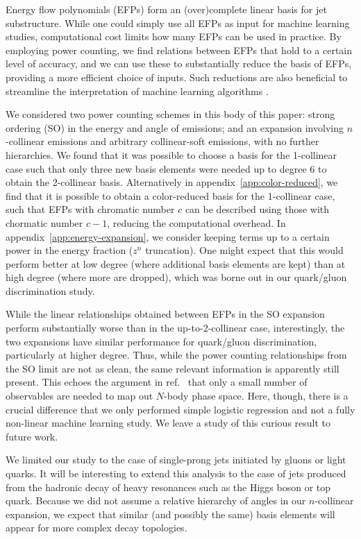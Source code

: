 \documentclass[a4paper,11pt]{article}
\newcommand{\app}[1]{appendix~\ref{app:#1}}
\newcommand{\refcite}[1]{ref.~\cite{#1}}
\begin{document}
Energy flow polynomials (EFPs) form an (over)complete linear basis for jet substructure.
%
While one could simply use all EFPs as input for machine learning studies, computational cost limits how many EFPs can be used in practice.
%
By employing power counting, we find relations between EFPs that hold to a certain level of accuracy, and we can use these to substantially reduce the basis of EFPs, providing a more efficient choice of inputs.
%
Such reductions are also beneficial to streamline the interpretation of machine learning algorithms \cite{Faucett:2020vbu}.


We considered two power counting schemes in this body of this paper: strong ordering (SO) in the energy and angle of emissions; and an expansion involving $n$-collinear emissions and arbitrary collinear-soft emissions, with no further hierarchies.
%
We found that it was possible to choose a basis for the 1-collinear case such that only three new basis elements were needed up to degree 6 to obtain the 2-collinear basis.
%
Alternatively in \app{color-reduced}, we find that it is possible to obtain a color-reduced basis for the 1-collinear case, such that EFPs with chromatic number $c$ can be described using those with chormatic number $c-1$, reducing the computational overhead.
%
In \app{energy-expansion}, we consider keeping terms up to a certain power in the energy fraction ($z^n$ truncation).
%
One might expect that this would perform better at low degree (where additional basis elements are kept) than at high degree (where more are dropped), which was borne out in our quark/gluon discrimination study. 



While the linear relationships obtained between EFPs in the SO expansion perform substantially worse than in the up-to-2-collinear case, interestingly, the two expansions have similar performance for quark/gluon discrimination, particularly at higher degree.
%
Thus, while the power counting relationships from the SO limit are not as clean, the same relevant information is apparently still present.
%
This echoes the argument in \refcite{Datta:2017rhs} that only a small number of observables are needed to map out $N$-body phase space.
%
Here, though, there is a crucial difference that we only performed simple logistic regression and not a fully non-linear machine learning study.
%
We leave a study of this curious result to future work.


We limited our study to the case of single-prong jets initiated by gluons or light quarks.
%
It will be interesting to extend this analysis to the case of jets produced from the hadronic decay of heavy resonances such as the Higgs boson or top quark.
%
Because we did not assume a relative hierarchy of angles in our $n$-collinear expansion, we expect that similar (and possibly the same) basis elements will appear for more complex decay topologies.
\end{document}
